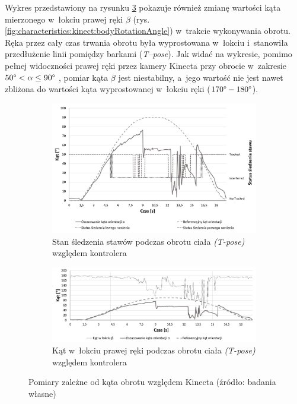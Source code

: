 Wykres przedstawiony na rysunku \ref{fig:characteristics:kinect:kinectRightHandElbowAngle} pokazuje również zmianę wartości kąta mierzonego w~łokciu prawej ręki $\beta$ (rys. \ref{fig:characteristics:kinect:bodyRotationAngle}) w~trakcie wykonywania obrotu. Ręka przez cały czas trwania obrotu była wyprostowana w~łokciu i~stanowiła przedłużenie linii pomiędzy barkami (\emph{T--pose}). Jak widać na wykresie, pomimo pełnej widoczności prawej ręki przez kamery Kinecta przy obrocie w~zakresie  $50\degree < \alpha \le 90\degree$ , pomiar kąta $\beta$ jest niestabilny, a~jego wartość nie jest nawet zbliżona do wartości kąta wyprostowanej w~łokciu ręki ($170\degree-180\degree$). 
\begin{savenotes}
	\begin{figure}[!htb]
		\captionsetup{singlelinecheck=off}
		\centering
		\begin{subfigure}[b]{0.9\textwidth}
			\centering
			\includegraphics[width=\linewidth]{images/kinectRotation.png}	
			\caption{Stan śledzenia stawów podczas obrotu ciała \emph{(T-pose)} względem kontrolera}
			\label{fig:characteristics:kinect:bodyRotationChart}
		\end{subfigure}
						
		\hfill																																																
		\begin{subfigure}[b]{0.9\textwidth}
			\centering
			\includegraphics[width=\linewidth]{images/kinectRightHandElbowAngle.png}		
			\caption{Kąt w~łokciu prawej ręki podczas obrotu ciała \emph{(T-pose)} względem kontrolera}
			\label{fig:characteristics:kinect:kinectRightHandElbowAngle}
		\end{subfigure}				
		\caption{Pomiary zależne od kąta obrotu względem Kinecta (źródło: badania własne)}
	\end{figure}
\end{savenotes}
																																					
